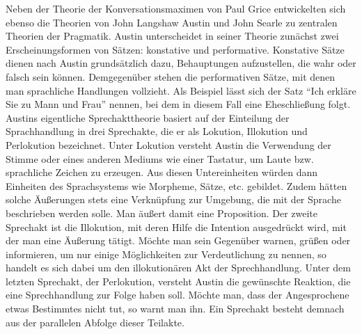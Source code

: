 Neben der Theorie der Konversationsmaximen von Paul Grice entwickelten sich ebenso die Theorien von John Langshaw Austin und John Searle zu zentralen Theorien der Pragmatik.
Austin unterscheidet in seiner Theorie zunächst zwei Erscheinungsformen von Sätzen: konstative und performative.
Konstative Sätze dienen nach Austin grundsätzlich dazu, Behauptungen aufzustellen, die wahr oder falsch sein können.
Demgegenüber stehen die performativen Sätze, mit denen man sprachliche Handlungen vollzieht.
Als Beispiel lässt sich der Satz "`Ich erkläre Sie zu Mann und Frau"' nennen, bei dem in diesem Fall eine Eheschließung folgt.
Austins eigentliche Sprechakttheorie basiert auf der Einteilung der Sprachhandlung in drei Sprechakte, die er als Lokution, Illokution und Perlokution bezeichnet.
Unter Lokution versteht Austin die Verwendung der Stimme oder eines anderen Mediums wie einer Tastatur, um Laute bzw. sprachliche Zeichen zu erzeugen.
Aus diesen Untereinheiten würden dann Einheiten des Sprachsystems wie Morpheme, Sätze, etc. gebildet.
Zudem hätten solche Äußerungen stets eine Verknüpfung zur Umgebung, die mit der Sprache beschrieben werden solle.
Man äußert damit eine Proposition.
Der zweite Sprechakt ist die Illokution, mit deren Hilfe die Intention ausgedrückt wird, mit der man eine Äußerung tätigt.
Möchte man sein Gegenüber warnen, grüßen oder informieren, um nur einige Möglichkeiten zur Verdeutlichung zu nennen, so handelt es sich dabei um den illokutionären Akt der Sprechhandlung.
Unter dem letzten Sprechakt, der Perlokution, versteht Austin die gewünschte Reaktion, die eine Sprechhandlung zur Folge haben soll.
Möchte man, dass der Angesprochene etwas Bestimmtes nicht tut, so warnt man ihn.
Ein Sprechakt besteht demnach aus der parallelen Abfolge dieser Teilakte.


